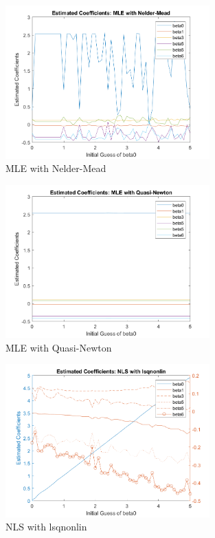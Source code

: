 \documentclass[11pt,letter]{article}
\begin{document}
\begin{figure}
\begin{center}
\caption{MLE with Nelder-Mead}
\includegraphics[width=0.7\textwidth]{MLE_NM.png} 
\end{center}
\end{figure}

\begin{figure}
\begin{center}
\caption{MLE with Quasi-Newton}
\includegraphics[width=0.7\textwidth]{MLE_QN.png} 
\end{center}
\end{figure}


\begin{figure}
\begin{center}
\caption{NLS with lsqnonlin}
\includegraphics[width=0.7\textwidth]{NLS_lsqnonlin.png} 
\end{center}
\end{figure}
\end{document}
